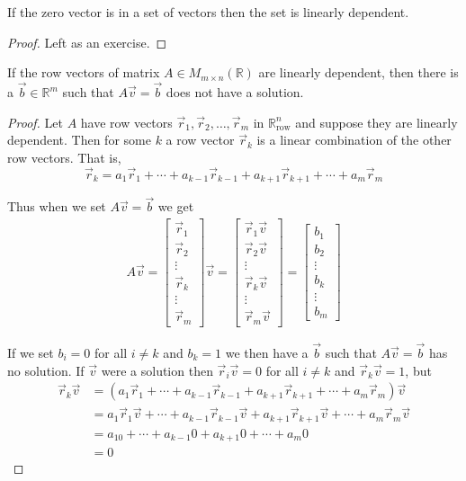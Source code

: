 \begin{proposition}\label{prop:zero_dependent} If the zero vector is in a set of vectors then the set is linearly dependent. 
\end{proposition}
\begin{proof}
Left as an exercise.
\end{proof}


\begin{proposition}\label{prop:zero_dependent} If the row vectors of matrix $A \in M_{m\times n}(\mathbb{R})$ are linearly dependent, then there is a  $\vec{b} \in \mathbb{R}^m$ such that $A\vec{v}=\vec{b}$ does not have a solution.
\end{proposition}
\begin{proof}
Let $A$ have row vectors $\vec{r}_1, \vec{r}_2, \ldots, \vec{r}_m$ in $\mathbb{R}^n_\text{row}$ and suppose they are linearly dependent. Then for some $k$ a row vector
$\vec{r}_k$ is a linear combination of the other row vectors. That is,
\[
\vec{r}_k=a_1\vec{r}_1+\cdots+a_{k-1}\vec{r}_{k-1}+a_{k+1}\vec{r}_{k+1}+\cdots+a_m\vec{r}_m
\]

Thus when we set $A\vec{v}=\vec{b}$ we get 
\begin{align*}
A\vec{v} = \begin{bmatrix}\vec{r}_1 \\ \vec{r}_2 \\ \vdots \\ \vec{r}_k \\ \vdots \\ \vec{r}_m\end{bmatrix}\vec{v}
= \begin{bmatrix}\vec{r}_1\vec{v} \\ \vec{r}_2\vec{v} \\ \vdots \\ \vec{r}_k\vec{v} \\ \vdots \\ \vec{r}_m\vec{v}\end{bmatrix}
=\begin{bmatrix}b_1 \\ b_2 \\ \vdots \\ b_k \\ \vdots \\ b_m\end{bmatrix}
\end{align*}

If we set $b_i=0$ for all $i \neq k$ and $b_k=1$ we then have a $\vec{b}$ such that $A\vec{v}=\vec{b}$ has no solution. If $\vec{v}$ were a solution  
then $\vec{r}_i\vec{v}=0$  for all $i \neq k$ and $\vec{r}_k\vec{v}=1$, but 
\begin{align*}
\vec{r}_k\vec{v} &= (a_1\vec{r}_1+\cdots+a_{k-1}\vec{r}_{k-1}+a_{k+1}\vec{r}_{k+1}+\cdots+a_m\vec{r}_m)\vec{v}\\
&= a_1\vec{r}_1\vec{v}+\cdots+a_{k-1}\vec{r}_{k-1}\vec{v}+a_{k+1}\vec{r}_{k+1}\vec{v}+\cdots+a_m\vec{r}_m\vec{v}\\
&= a_10+\cdots+a_{k-1}0+a_{k+1}0+\cdots+a_m0\\
&= 0
\end{align*}
\end{proof}

